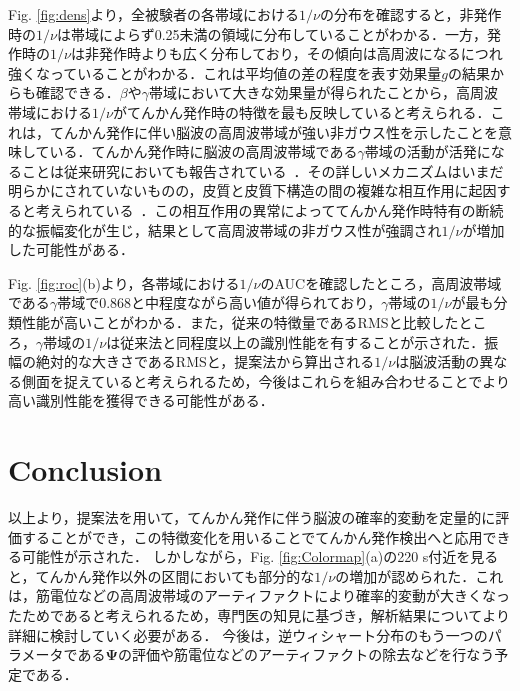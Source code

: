 \documentclass[journal]{IEEEtran}
\begin{document}
Fig. \ref{fig:dens}より，全被験者の各帯域における$1/\nu$の分布を確認すると，非発作時の$1/\nu$は帯域によらず0.25未満の領域に分布していることがわかる．一方，発作時の$1/\nu$は非発作時よりも広く分布しており，その傾向は高周波になるにつれ強くなっていることがわかる．これは平均値の差の程度を表す効果量$g$の結果からも確認できる．$\beta$や$\gamma$帯域において大きな効果量が得られたことから，高周波帯域における$1/\nu$がてんかん発作時の特徴を最も反映していると考えられる．これは，てんかん発作に伴い脳波の高周波帯域が強い非ガウス性を示したことを意味している．てんかん発作時に脳波の高周波帯域である$\gamma$帯域の活動が活発になることは従来研究においても報告されている~\cite{Kobayashi2004,Kobayashi2009,Benedek2016}．その詳しいメカニズムはいまだ明らかにされていないものの，皮質と皮質下構造の間の複雑な相互作用に起因すると考えられている~\cite{Kobayashi2004}．この相互作用の異常によっててんかん発作時特有の断続的な振幅変化が生じ，結果として高周波帯域の非ガウス性が強調され$1/\nu$が増加した可能性がある．

Fig. \ref{fig:roc}(b)より，各帯域における$1/\nu$のAUCを確認したところ，高周波帯域である$\gamma$帯域で0.868と中程度ながら高い値が得られており，$\gamma$帯域の$1/\nu$が最も分類性能が高いことがわかる．また，従来の特徴量であるRMSと比較したところ，$\gamma$帯域の$1/\nu$は従来法と同程度以上の識別性能を有することが示された．振幅の絶対的な大きさであるRMSと，提案法から算出される$1/\nu$は脳波活動の異なる側面を捉えていると考えられるため，今後はこれらを組み合わせることでより高い識別性能を獲得できる可能性がある．

\section{Conclusion}
以上より，提案法を用いて，てんかん発作に伴う脳波の確率的変動を定量的に評価することができ，この特徴変化を用いることでてんかん発作検出へと応用できる可能性が示された．
しかしながら，Fig. \ref{fig:Colormap}(a)の220 s付近を見ると，てんかん発作以外の区間においても部分的な$1/\nu$の増加が認められた．これは，筋電位などの高周波帯域のアーティファクトにより確率的変動が大きくなったためであると考えられるため，専門医の知見に基づき，解析結果についてより詳細に検討していく必要がある．
今後は，逆ウィシャート分布のもう一つのパラメータである$\mathbf{\Psi}$の評価や筋電位などのアーティファクトの除去などを行なう予定である．
\end{document}
